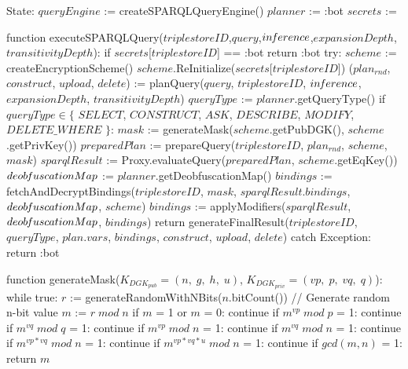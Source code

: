 State:
    $queryEngine$ := createSPARQLQueryEngine()
    $planner$ := :bot
    $secrets$ := {}

function executeSPARQLQuery($triplestoreID$,$query$,$in\textrm{\emph{f}}erence$,$expansionDepth$,$transitivityDepth$):
    if $secrets$[$triplestoreID$] == :bot
        return :bot
    try:
        $scheme$ := createEncryptionScheme()
        $scheme$.ReInitialize($secrets$[$triplestoreID$])
        ($plan_{rnd}$, $construct$, $upload$, $delete$) := planQuery($query$, $triplestoreID$, $in\textrm{\emph{f}}erence$, $expansionDepth$, $transitivityDepth$) 
        $queryType$ := $planner$.getQueryType()
        if $queryType \in \{$ $SELECT$, $CONSTRUCT$, $ASK$, $DESCRIBE$, $MODIFY$, $DELETE\_WHERE$ $\}$:
            $mask$ := generateMask($scheme$.getPubDGK(), $scheme$.getPrivKey())
            $preparedPlan$ := prepareQuery($triplestoreID$, $plan_{rnd}$, $scheme$, $mask$)
            $sparqlResult$ := Proxy.evaluateQuery($preparedPlan$, $scheme$.getEqKey())
            $deob\textrm{\emph{f}}uscationMap$ := $planner$.getDeobfuscationMap()
            $bindings$ := fetchAndDecryptBindings($triplestoreID$, $mask$, $sparqlResult$.$bindings$, $deob\textrm{\emph{f}}uscationMap$, $scheme$)
            $bindings$ := applyModifiers($sparqlResult$, $deob\textrm{\emph{f}}uscationMap$, $bindings$)
        return generateFinalResult($triplestoreID$, $queryType$, $plan$.$vars$, $bindings$, $construct$, $upload$, $delete$)
    catch Exception:
        return :bot

function generateMask($K_{DGK_{pub}} = (n, \; g, \; h, \; u)$, $K_{DGK_{priv}} = (vp, \; p, \; vq, \; q)$):
    while true:
        $r$ := generateRandomWithNBits($n$.bitCount()) // Generate random n-bit value
        $m$ := $r \; mod \; n$
        if $m$ = 1 or $m$ = 0:
            continue
        if $m^{vp} \; mod \; p$ = 1:
            continue
        if $m^{vq} \; mod \; q$ = 1:
            continue
        if $m^{vp} \; mod \; n$ = 1:
            continue
        if $m^{vq} \; mod \; n$ = 1:
            continue
        if $m^{vp*vq} \; mod \; n$ = 1:
            continue
        if $m^{vp*vq*u} \; mod \; n$ = 1:
            continue
        if $gcd(m, n)$ = 1:
            return $m$